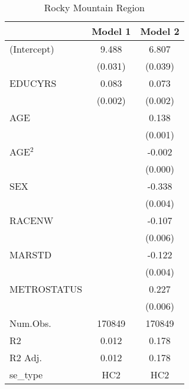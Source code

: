 \documentclass[12pt, English]{article}
\begin{document}
\begin{table}
\centering %
    \caption{Rocky Mountain Region}
    \vspace{7.5mm} %
\begin{tabular}[t]{lcc}
\toprule
  & Model 1 & Model 2\\
\midrule
(Intercept) & 9.488 & 6.807\\
 & (0.031) & (0.039)\\
EDUCYRS & 0.083 & 0.073\\
 & (0.002) & (0.002)\\
AGE &  & 0.138\\
 &  & (0.001)\\
AGE$^2$ &  & -0.002\\
 &  & (0.000)\\
SEX &  & -0.338\\
 &  & \vphantom{1} (0.004)\\
RACENW &  & -0.107\\
 &  & \vphantom{1} (0.006)\\
MARSTD &  & -0.122\\
 &  & (0.004)\\
METROSTATUS &  & 0.227\\
 &  & (0.006)\\
\midrule
Num.Obs. & 170849 & 170849\\
R2 & 0.012 & 0.178\\
R2 Adj. & 0.012 & 0.178\\
se\_type & HC2 & HC2\\
\bottomrule
\end{tabular}
\end{table}

\newpage
\end{document}
